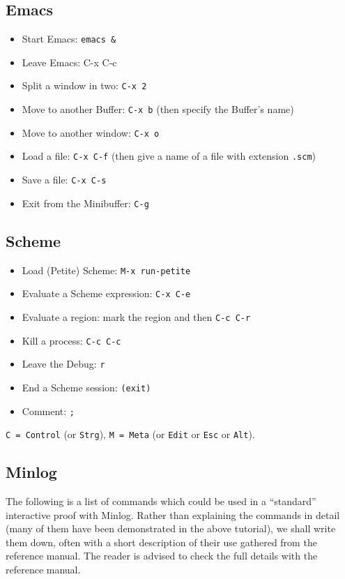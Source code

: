 \documentclass[12pt]{amsart}
\newcommand{\inquotes}[1]{``#1''}
\newcommand{\mi}{Minlog}
\begin{document}
\begin{appendix}
\subsection{Emacs}
\label{SS:Emacs}
\begin{itemize}
\item Start Emacs: \texttt{emacs \&}
\item Leave Emacs: C-x C-c
\item Split a window in two: \texttt{C-x 2}
\item Move to another Buffer: \texttt{C-x b}
(then specify the Buffer's name)
\item Move to another window: \texttt{C-x o}
\item Load a file: \texttt{C-x C-f}
(then give a name of a file with extension \texttt{.scm})
\item Save a file: \texttt{C-x C-s}
\item Exit from the Minibuffer: \texttt{C-g}
\end{itemize}

\subsection{Scheme}
\label{SS:Scheme}
\begin{itemize}
\item Load  (Petite) Scheme:  \texttt{M-x run-petite}
\item Evaluate a Scheme expression: \texttt{C-x C-e}
\item Evaluate a region: mark the region and then \texttt{C-c C-r}
\item Kill a process: \texttt{C-c C-c} 
\item Leave the Debug: \texttt{r}
\item End a Scheme session: \texttt{(exit)}
\item Comment: \texttt{;}
\end{itemize}
\texttt{C = Control} (or \texttt{Strg}), \texttt{M = Meta} (or
\texttt{Edit} or \texttt{Esc} or \texttt{Alt}).

\subsection{Minlog}
\label{SS:Minlog}
The following is a list of commands which could be used in a
\inquotes{standard} interactive proof with \mi. Rather than explaining
the commands in detail (many of them have been demonstrated in the
above tutorial), we shall write them down, often with a short
description of their use gathered from the reference manual.  The
reader is advised to check the full details with the reference manual.


\end{appendix}
\end{document}
